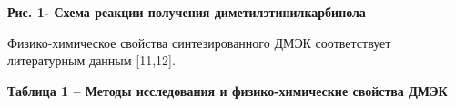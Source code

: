 {\bfseries Рис. 1- Схема реакции получения диметилэтинилкарбинола}

Физико-химическое свойства синтезированного ДМЭК соответствует
литературным данным {[}11,12{]}.

{\bfseries Таблица 1 -- Методы исследования и физико-химические свойства
ДМЭК}


